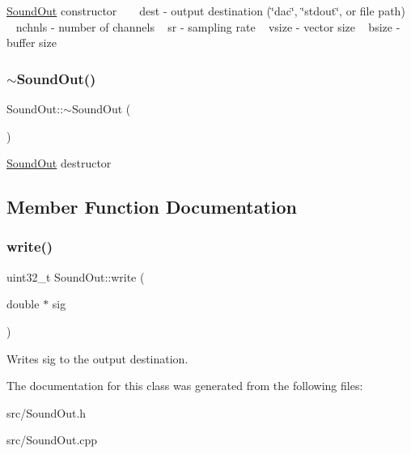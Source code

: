 \hyperlink{class_sound_out}{Sound\+Out} constructor ~\newline
~\newline
dest -\/ output destination (\char`\"{}dac\char`\"{}, \char`\"{}stdout\char`\"{}, or file path) ~\newline
nchnls -\/ number of channels ~\newline
sr -\/ sampling rate ~\newline
vsize -\/ vector size ~\newline
bsize -\/ buffer size ~\newline
\mbox{\label{class_sound_out_acef6789ce8fd42636630cd19287d23d6}} 
\subsubsection{\texorpdfstring{$\sim$\+Sound\+Out()}{~SoundOut()}}
{\footnotesize\ttfamily Sound\+Out\+::$\sim$\+Sound\+Out (\begin{DoxyParamCaption}{ }\end{DoxyParamCaption})}

\hyperlink{class_sound_out}{Sound\+Out} destructor 

\subsection{Member Function Documentation}
\mbox{\label{class_sound_out_ae2cb2b2e4679a44c467e11f1893961f5}} 
\subsubsection{\texorpdfstring{write()}{write()}}
{\footnotesize\ttfamily uint32\+\_\+t Sound\+Out\+::write (\begin{DoxyParamCaption}\item[{double $\ast$}]{sig }\end{DoxyParamCaption})}

Writes sig to the output destination. 

The documentation for this class was generated from the following files\+:\begin{DoxyCompactItemize}
\item 
src/Sound\+Out.\+h\item 
src/Sound\+Out.\+cpp\end{DoxyCompactItemize}

